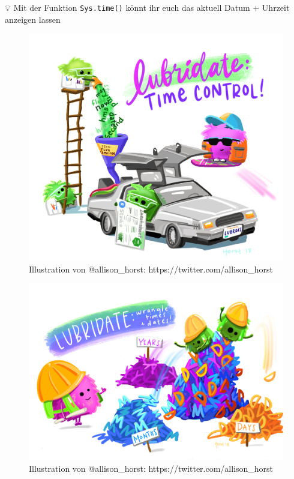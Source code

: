\documentclass[
]{article}
\begin{document}
💡 Mit der Funktion \texttt{Sys.time()} könnt ihr euch das aktuell Datum + Uhrzeit anzeigen lassen

\begin{figure}

{\centering \includegraphics[width=1\linewidth]{images/035} 

}

\caption{Illustration von @allison_horst: https://twitter.com/allison_horst}\label{fig:unnamed-chunk-117}
\end{figure}

\begin{figure}

{\centering \includegraphics[width=1\linewidth]{images/036} 

}

\caption{Illustration von @allison_horst: https://twitter.com/allison_horst}\label{fig:unnamed-chunk-118}
\end{figure}
\end{document}
